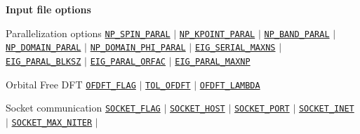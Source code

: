 \begin{frame}[allowframebreaks]{\textbf{Input file options}}
  \begin{block}{Parallelization options}
  \hyperlink{NP_SPIN_PARAL}{\texttt{NP\_SPIN\_PARAL}} $\vert$
  \hyperlink{NP_KPOINT_PARAL}{\texttt{NP\_KPOINT\_PARAL}} $\vert$
  \hyperlink{NP_BAND_PARAL}{\texttt{NP\_BAND\_PARAL}} $\vert$
  \hyperlink{NP_DOMAIN_PARAL}{\texttt{NP\_DOMAIN\_PARAL}} $\vert$
  \hyperlink{NP_DOMAIN_PHI_PARAL}{\texttt{NP\_DOMAIN\_PHI\_PARAL}} $\vert$
  \hyperlink{EIG_SERIAL_MAXNS}{\texttt{EIG\_SERIAL\_MAXNS}} $\vert$
  \hyperlink{EIG_PARAL_BLKSZ}{\texttt{EIG\_PARAL\_BLKSZ}} $\vert$
  \hyperlink{EIG_PARAL_ORFAC}{\texttt{EIG\_PARAL\_ORFAC}} $\vert$
  \hyperlink{EIG_PARAL_MAXNP}{\texttt{EIG\_PARAL\_MAXNP}}
  \end{block}

  \begin{block}{Orbital Free DFT}
  \hyperlink{OFDFT_FLAG}{\texttt{OFDFT\_FLAG}} $\vert$ \hyperlink{TOL_OFDFT}{\texttt{TOL\_OFDFT}} $\vert$ \hyperlink{OFDFT_LAMBDA}{\texttt{OFDFT\_LAMBDA}}
  \end{block}

  \begin{block}{Socket communication}
  \hyperlink{SOCKET_FLAG}{\texttt{SOCKET\_FLAG}} $\vert$
  \hyperlink{SOCKET_HOST}{\texttt{SOCKET\_HOST}} $\vert$
  \hyperlink{SOCKET_PORT}{\texttt{SOCKET\_PORT}} $\vert$
  \hyperlink{SOCKET_INET}{\texttt{SOCKET\_INET}} $\vert$
  \hyperlink{SOCKET_MAX_NITER}{\texttt{SOCKET\_MAX\_NITER}} $\vert$
  \end{block}
  
  \end{frame}
  
